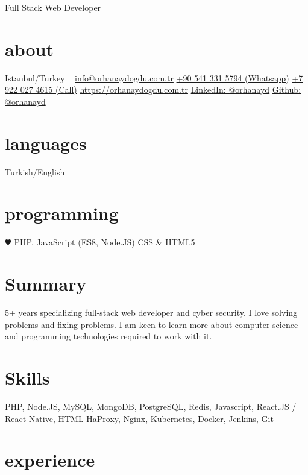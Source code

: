 \documentclass[]{friggeri-cv}
\begin{document}
       {Full Stack Web Developer}


\begin{aside}
  \section{about}
    Istanbul/Turkey
    ~
    \href{mailto:info@orhanaydogdu.com.tr}{info@orhanaydogdu.com.tr}
    \href{tel:+90 541 331 5794}{+90 541 331 5794 (Whatsapp)}
    \href{tel:+7 922 027 4615}{+7 922 027 4615 (Call)}
    \href{https://orhanaydogdu.com.tr?lang=en}{https://orhanaydogdu.com.tr}
    \href{https://www.linkedin.com/in/orhanayd/}{LinkedIn: @orhanayd}
    \href{https://github.com/orhanayd/}{Github: @orhanayd}
  \section{languages}
    Turkish/English
  \section{programming}
    {\color{red} $\varheartsuit$} PHP, JavaScript
    (ES8, Node.JS)
    CSS \& HTML5
\end{aside}

\section{Summary}

5+ years specializing full-stack web developer and cyber security. I love solving problems and fixing problems. I am keen to learn more about computer science and programming technologies required to work with it.

\section{Skills}

PHP, Node.JS, MySQL, MongoDB, PostgreSQL, Redis, Javascript, React.JS / React Native, HTML
HaProxy, Nginx, Kubernetes, Docker, Jenkins, Git

\section{experience}
\end{document}
